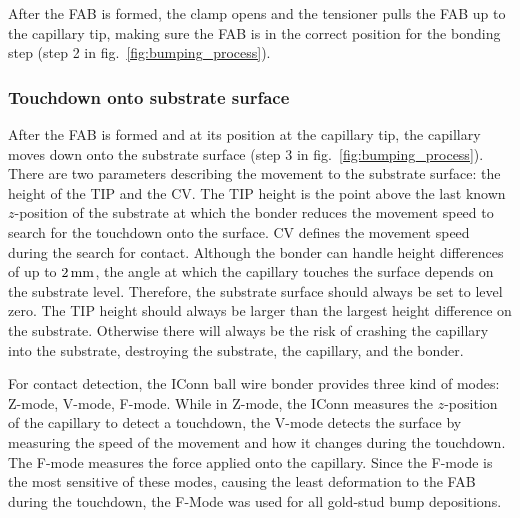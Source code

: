 After the \ac{FAB} is formed, the clamp opens and the tensioner pulls the \ac{FAB} up to the capillary tip, making sure the \ac{FAB} is in the correct position for the bonding step (step 2 in fig.~\ref{fig:bumping_process}).

\subsubsection{Touchdown onto substrate surface}
After the \ac{FAB} is formed and at its position at the capillary tip, the capillary moves down onto the substrate surface (step 3 in fig.~\ref{fig:bumping_process}). There are two parameters describing the movement to the substrate surface: the height of the \ac{TIP} and the \ac{CV}. The \ac{TIP} height is the point above the last known $z$-position of the substrate at which the bonder reduces the movement speed to search for the touchdown onto the surface. \ac{CV} defines the movement speed during the search for contact. Although the bonder can handle height differences of up to $2\,\rm{mm}$, the angle at which the capillary touches the surface depends on the substrate level. Therefore, the substrate surface should always be set to level zero. The \ac{TIP} height should always be larger than the largest height difference on the substrate. Otherwise there will always be the risk of crashing the capillary into the substrate, destroying the substrate, the capillary, and the bonder.

For contact detection, the IConn ball wire bonder provides three kind of modes: Z-mode, V-mode, F-mode. While in Z-mode, the IConn measures the $z$-position of the capillary to detect a touchdown, the V-mode detects the surface by measuring the speed of the movement and how it changes during the touchdown. The F-mode measures the force applied onto the capillary. Since the F-mode is the most sensitive of these modes, causing the least deformation to the \ac{FAB} during the touchdown, the F-Mode was used for all gold-stud bump depositions.


